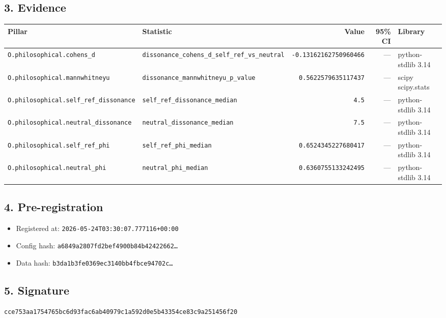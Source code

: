 \documentclass{article}
\begin{document}
\subsection*{3. Evidence}
\begin{tabular}{llrrl}\toprule
\textbf{Pillar} & \textbf{Statistic} & \textbf{Value} & \textbf{95\% CI} & \textbf{Library} \\\midrule
\texttt{O.philosophical.cohens\_d} & \texttt{dissonance\_cohens\_d\_self\_ref\_vs\_neutral} & \texttt{-0.13162162750960466} & --- & python-stdlib 3.14 \\
\texttt{O.philosophical.mannwhitneyu} & \texttt{dissonance\_mannwhitneyu\_p\_value} & \texttt{0.5622579635117437} & --- & scipy scipy.stats \\
\texttt{O.philosophical.self\_ref\_dissonance} & \texttt{self\_ref\_dissonance\_median} & \texttt{4.5} & --- & python-stdlib 3.14 \\
\texttt{O.philosophical.neutral\_dissonance} & \texttt{neutral\_dissonance\_median} & \texttt{7.5} & --- & python-stdlib 3.14 \\
\texttt{O.philosophical.self\_ref\_phi} & \texttt{self\_ref\_phi\_median} & \texttt{0.6524345227680417} & --- & python-stdlib 3.14 \\
\texttt{O.philosophical.neutral\_phi} & \texttt{neutral\_phi\_median} & \texttt{0.6360755133242495} & --- & python-stdlib 3.14 \\
\bottomrule\end{tabular}
\subsection*{4. Pre-registration}
\begin{itemize}
\item Registered at: \texttt{2026-05-24T03:30:07.777116+00:00}
\item Config hash: \texttt{a6849a2807fd2bef4900b84b42422662\dots}
\item Data hash: \texttt{b3da1b3fe0369ec3140bb4fbce94702c\dots}
\end{itemize}
\subsection*{5. Signature}
\texttt{cce753aa1754765bc6d93fac6ab40979c1a592d0e5b43354ce83c9a251456f20}\\
\end{document}
